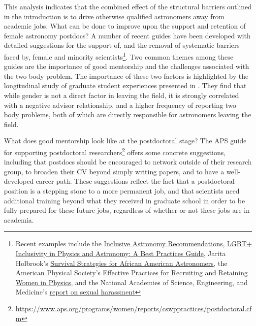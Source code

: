 \documentclass[modern]{aastex62}
\begin{document}
This analysis indicates that the combined effect of the structural barriers outlined in the introduction is to drive otherwise qualified astronomers away from academic jobs. What can be done to improve upon the support and retention of female astronomy postdocs? A number of recent guides have been developed with detailed suggestions for the support of, and the removal of systematic barriers faced by, female and minority scientists\footnote{Recent examples include the \href{https://tiki.aas.org/tiki-index.php?page=Inclusive_Astronomy_The_Nashville_Recommendations}{Inclusive Astronomy Recommendations},  \href{https://arxiv.org/abs/1804.08406}{LGBT+ Inclusivity in Physics and Astronomy: A Best Practices Guide}, Jarita Holbrook's \href{https://arxiv.org/abs/1204.0247}{Survival Strategies for African American Astronomers}, the American Physical Society's \href{https://www.aps.org/programs/women/reports/cswppractices/index.cfm}{Effective Practices for Recruiting and Retaining Women in Physics}, and the National Academies of Science, Engineering, and Medicine's \href{https://doi.org/10.17226/24994}{report on sexual harassment}}. Two common themes among these guides are the importance of good mentorship and the challenges associated with the two body problem. The importance of these two factors is highlighted by the longitudinal study of graduate student experiences presented in \citet{ivi16}. They find that while gender is not a direct factor in leaving the field, it is strongly correlated with a negative advisor relationship, and a higher frequency of reporting two body problems, both of which are directly responsible for astronomers leaving the field. 

What does good mentorship look like at the postdoctoral stage? The APS guide for supporting postdoctoral researchers\footnote{\url{https://www.aps.org/programs/women/reports/cswppractices/postdoctoral.cfm}} offers some concrete suggestions, including that postdocs should be encouraged to network outside of their research group, to broaden their CV beyond simply writing papers, and to have a well-developed career path. These suggestions reflect the fact that a postdoctoral position is a stepping stone to a more permanent job, and that scientists need additional training beyond what they received in graduate school in order to be fully prepared for these future jobs, regardless of whether or not these jobs are in academia. 
\end{document}
